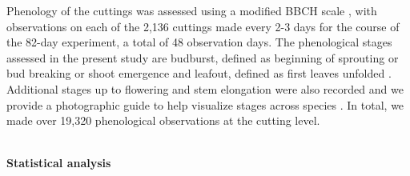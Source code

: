 \documentclass[11pt]{article}
\begin{document}
Phenology of the cuttings was assessed using a modified BBCH scale \citep{Finn:2007}, with observations on each of the 2,136 cuttings made every 2-3 days for the course of the 82-day experiment, a total of 48 observation days. The phenological stages assessed in the present study are budburst, defined as beginning of sprouting or bud breaking or shoot emergence \citep[Code 07 in][]{Finn:2007} and leafout, defined as first leaves unfolded \citep[Code 11 in][]{Finn:2007}. Additional stages up to flowering and stem elongation were also recorded and we provide a photographic guide to help visualize stages across species \citep{bbchguide}. In total, we made over 19,320 phenological observations at the cutting level.
%

\vspace{1ex}\\
\noindent \textbf{Statistical analysis}
\end{document}
